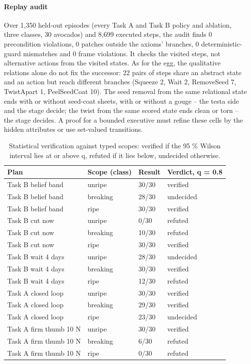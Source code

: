 \documentclass[10.5pt,a4paper]{article}
\begin{document}
\paragraph{Replay audit} Over 1,350 held-out episodes (every Task A and Task B policy and
ablation, three classes, 30 avocados) and 8,699 executed steps, the audit finds 0 precondition violations, 0 patches outside the axioms' branches, 0 deterministic-guard mismatches and 0 frame violations. It checks the visited steps, not alternative actions from the visited states. As for the egg, the
qualitative relations alone do not fix the successor: 22 pairs of steps share an
abstract state and an action but reach different branches (Squeeze 2, Wait 2, RemoveSeed 7, TwistApart 1, PeelSeedCoat 10). The seed removal from the
same relational state ends with or without seed-coat sheets, with or without a gouge -- the testa side and the stage
decide; the twist from the same scored state ends clean or torn -- the stage decides. A proof for a bounded
executive must refine these cells by the hidden attributes or use set-valued transitions.
\begin{table}[htbp]\centering\scriptsize\caption{Statistical verification against typed scopes: verified if the 95 \% Wilson interval lies at or above q, refuted if it lies below, undecided otherwise.}
\begin{tabularx}{\linewidth}{@{}Xlll@{}}\toprule Plan & Scope (class) & Result & Verdict, q = 0.8 \\\midrule
Task B belief band & unripe & 30/30 & verified \\
Task B belief band & breaking & 28/30 & undecided \\
Task B belief band & ripe & 30/30 & verified \\
Task B cut now & unripe & 0/30 & refuted \\
Task B cut now & breaking & 10/30 & refuted \\
Task B cut now & ripe & 30/30 & verified \\
Task B wait 4 days & unripe & 28/30 & undecided \\
Task B wait 4 days & breaking & 30/30 & verified \\
Task B wait 4 days & ripe & 12/30 & refuted \\
Task A closed loop & unripe & 30/30 & verified \\
Task A closed loop & breaking & 29/30 & verified \\
Task A closed loop & ripe & 23/30 & undecided \\
Task A firm thumb 10 N & unripe & 30/30 & verified \\
Task A firm thumb 10 N & breaking & 6/30 & refuted \\
Task A firm thumb 10 N & ripe & 0/30 & refuted \\\bottomrule\end{tabularx}\end{table}
\end{document}
